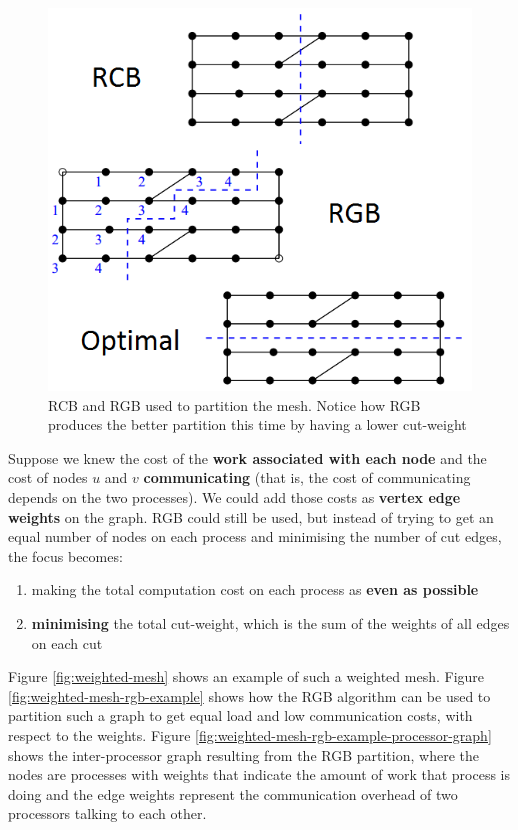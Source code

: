 \documentclass{article}
\begin{document}
\begin{figure}
	\centering
	\includegraphics[scale=0.35]{figures/rcb-rgb-example-graph.png}
	\caption{RCB and RGB used to partition the mesh. Notice how RGB produces the better partition this time by having a lower cut-weight}
	\label{fig:rcb-rgb-example-graph}
\end{figure}

Suppose we knew the cost of the \textbf{work associated with each node} and the cost of nodes $u$ and $v$ \textbf{communicating} (that is, the cost of communicating depends on the two processes). We could add those costs as \textbf{vertex edge weights} on the graph. RGB could still be used, but instead of trying to get an equal number of nodes on each process and minimising the number of cut edges, the focus becomes:
\begin{enumerate}
	\item making the total computation cost on each process as \textbf{even as possible}
	\item \textbf{minimising} the total cut-weight, which is the sum of the weights of all edges on each cut
\end{enumerate}

Figure \ref{fig:weighted-mesh} shows an example of such a weighted mesh. Figure \ref{fig:weighted-mesh-rgb-example} shows how the RGB algorithm can be used to partition such a graph to get equal load and low communication costs, with respect to the weights. Figure \ref{fig:weighted-mesh-rgb-example-processor-graph} shows the inter-processor graph resulting from the RGB partition, where the nodes are processes with weights that indicate the amount of work that process is doing and the edge weights represent the communication overhead of two processors talking to each other.
\end{document}
